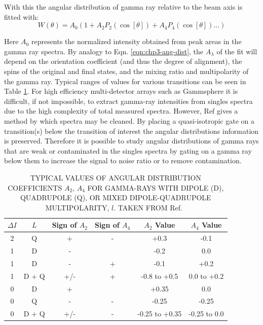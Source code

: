 With this the angular distribution of gamma ray relative to the beam axis is fitted with:
\begin{equation}
\label{eqn:chp3-ang-dist-fit}
W(\theta{}) = A_{0}(1 + A_{2} P_{2}(\cos[\theta{}]) + A_{4} P_{4}(\cos[\theta{}]) ...)
\end{equation}

Here $A_{0}$ represents the normalized intensity obtained from peak areas in the gamma ray spectra. By analogy to Eqn. \ref{eqn:chp3-ang-dist}, the $A_{\lambda{}}$ of the fit will depend on the orientation coefficient (and thus the degree of alignment), the spins of the original and final states, and the mixing ratio and multipolarity of the gamma ray. Typical ranges of values for various transitions can be seen in Table \ref{tbl:chp3-ang-dis-fit-ranges}. For high efficiency multi-detector arrays such as Gammsphere it is difficult, if not impossible, to extract gamma-ray intensities from singles spectra due to the high complexity of total measured spectra. However, Ref \cite{angDistGates} gives a method by which spectra may be cleaned. By placing a quasi-isotropic gate on a transition(s) below the transition of interest the angular distributions information is preserved. Therefore it is possible to study angular distributions of gamma rays that are weak or contaminated in the singles spectra by gating on a gamma ray below them to increase the signal to noise ratio or to remove contamination.

\begin{table}[t]
\setlength{\abovecaptionskip}{-2pt}   %
\setlength{\belowcaptionskip}{0.5pt}
\caption[\uppercase{Typical values of angular distribution coefficients $A_2$, $A_4$ for gamma-rays with Dipole (D), Quadrupole (Q), or mixed Dipole-Quadrupole Multipolarity, $l$.}]{\uppercase{Typical values of angular distribution coefficients $A_2$, $A_4$ for gamma-rays with Dipole (D), Quadrupole (Q), or mixed Dipole-Quadrupole Multipolarity, $l$.  Taken from} Ref.~\cite{angDistAVals}} \label{tbl:chp3-ang-dis-fit-ranges}
\centering
\begin{tabular}{c@{\hskip 0.3in}c@{\hskip 0.2in}c@{\hskip 0.15in}c@{\hskip 0.2in}c@{\hskip 0.3in}c}
\hline\hline
$\Delta I$ & $L$ & Sign of $A_2$ & Sign of $A_4$ & $A_2$ Value & $A_4$ Value\\
\hline
2 & Q & + & - & +0.3 & -0.1\\
1 & D & - &  & -0.2 & 0.0\\
1 & D & - & + & -0.1 & +0.2\\
1 & D + Q & +/- & + & -0.8 to +0.5 & 0.0 to +0.2\\
0 & D & + &  & +0.35 & 0.0\\
0 & Q & - & - & -0.25 & -0.25\\
0 & D + Q & +/- & - & -0.25 to +0.35 & -0.25 to 0.0\\
\hline\hline
\end{tabular}
\end{table}


